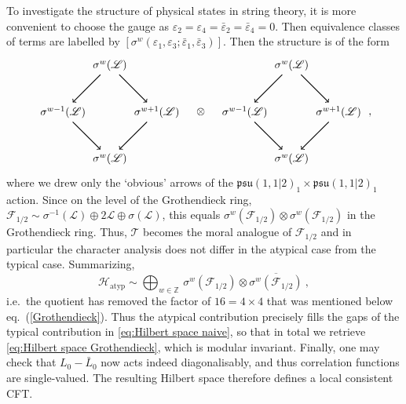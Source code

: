 \documentclass[12pt,a4paper]{article}
\newcommand{\be}{\begin{equation}}
\newcommand{\ee}{\end{equation}}
\begin{document}
To investigate the structure of physical states in string theory, it is more convenient to choose the gauge as $\varepsilon_2=\varepsilon_4=\bar{\varepsilon}_2=\bar{\varepsilon}_4=0$. Then equivalence classes of terms are labelled by $[\sigma^w(\varepsilon_1,\varepsilon_3;\bar{\varepsilon}_1,\bar{\varepsilon}_3)]$. Then the structure is of the form 
\be 
\begin{tikzpicture}[baseline={([yshift=-.5ex]current bounding box.center)}]
\node (top) at (0,1.5) {$\sigma^w(\mathscr{L})$};
\node (left) at (-1.5,0) {$\sigma^{w-1}(\mathscr{L})$};
\node (right) at (1.5,0) {$\sigma^{w+1}(\mathscr{L})$};
\node (bottom) at (0,-1.5) {$\sigma^w(\mathscr{L})$};
\draw[thick,->] (top) to (right);
\draw[thick,->] (top) to (left);
\draw[thick,->] (left) to (bottom);
\draw[thick,->] (right) to (bottom);
\end{tikzpicture}
\quad
\otimes 
\quad
\begin{tikzpicture}[baseline={([yshift=-.5ex]current bounding box.center)}]
\node (top) at (0,1.5) {$\sigma^w(\mathscr{L})$};
\node (left) at (-1.5,0) {$\sigma^{w-1}(\mathscr{L})$};
\node (right) at (1.5,0) {$\sigma^{w+1}(\mathscr{L})$};
\node (bottom) at (0,-1.5) {$\sigma^w(\mathscr{L})$};
\draw[thick,->] (top) to (right);
\draw[thick,->] (top) to (left);
\draw[thick,->] (left) to (bottom);
\draw[thick,->] (right) to (bottom);
\end{tikzpicture}\ , \label{eq:symmetric gauge}
\ee
where we drew only the `obvious' arrows of the $\mathfrak{psu}(1,1|2)_1 \times \mathfrak{psu}(1,1|2)_1$ action. Since on the level of the Grothendieck ring, $\mathscr{F}_{1/2} \sim \sigma^{-1}(\mathscr{L}) \oplus 2 \mathscr{L} \oplus \sigma(\mathscr{L})$, this equals $\sigma^w(\mathscr{F}_{1/2}) \otimes \sigma^w(\mathscr{F}_{1/2})$ in the Grothendieck ring.
Thus, $\mathscr{T}$ becomes the moral analogue of $\mathscr{F}_{1/2}$ and in particular the character analysis does not differ in the atypical case from the typical case.
Summarizing,
\be \label{C.8}
\mathcal{H}_\text{atyp} \sim \bigoplus_{w \in \mathds{Z}}\, \sigma^w(\mathscr{F}_{1/2}) \otimes \overline{\sigma^w(\mathscr{F}_{1/2})}\ ,
\ee
i.e.\ the quotient has removed the factor of $16=4 \times 4$ that was mentioned below eq.~(\ref{Grothendieck}).
Thus the atypical contribution precisely fills the gaps of the typical contribution in \eqref{eq:Hilbert space naive}, so that in total we retrieve \eqref{eq:Hilbert space Grothendieck}, which is modular invariant.
Finally, one may check that $L_0-\bar{L}_0$ now acts indeed diagonalisably, and thus correlation functions are single-valued. The resulting Hilbert space therefore defines a local consistent CFT.
\end{document}
